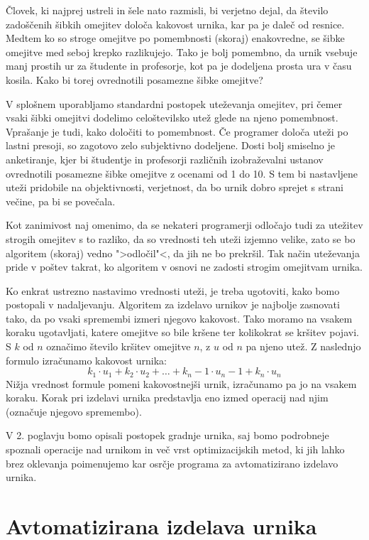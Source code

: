 \documentclass[a4paper, 10pt]{article}
\begin{document}
Človek, ki najprej ustreli in šele nato razmisli, bi verjetno dejal, da število
zadoščenih šibkih omejitev določa kakovost urnika, kar pa je daleč od resnice. Medtem
ko so stroge omejitve po pomembnosti (skoraj) enakovredne, se šibke omejitve med seboj
krepko razlikujejo. Tako je bolj pomembno, da urnik vsebuje manj prostih ur za
študente in profesorje, kot pa je dodeljena prosta ura v času kosila. Kako bi torej
ovrednotili posamezne šibke omejitve?

V splošnem uporabljamo standardni postopek uteževanja omejitev, pri čemer vsaki šibki
omejitvi dodelimo celoštevilsko utež glede na njeno pomembnost. Vprašanje je tudi, kako
določiti to pomembnost. Če programer določa uteži po lastni presoji, so zagotovo zelo
subjektivno dodeljene. Dosti bolj smiselno je anketiranje, kjer bi študentje in profesorji
različnih izobraževalni ustanov ovrednotili posamezne šibke omejitve z ocenami od 1 do 10.
S tem bi nastavljene uteži pridobile na objektivnosti, verjetnost, da bo urnik dobro
sprejet s strani večine, pa bi se povečala.

Kot zanimivost naj omenimo, da se nekateri programerji odločajo tudi za utežitev strogih
omejitev s to razliko, da so vrednosti teh uteži izjemno velike, zato se bo algoritem
(skoraj) vedno ">odločil"<, da jih ne bo prekršil. Tak način uteževanja pride v poštev
takrat, ko algoritem v osnovi ne zadosti strogim omejitvam urnika.

Ko enkrat ustrezno nastavimo vrednosti uteži, je treba ugotoviti, kako bomo postopali
v nadaljevanju. Algoritem za izdelavo urnikov je najbolje zasnovati tako, da po vsaki
spremembi izmeri njegovo kakovost. Tako moramo na vsakem koraku ugotavljati, katere
omejitve so bile kršene ter kolikokrat se kršitev pojavi. S $k$ od $n$ označimo število
kršitev omejitve $n$, z $u$ od $n$ pa njeno utež. Z naslednjo formulo izračunamo
kakovost urnika:
\[ k_1 \cdot u_1 + k_2 \cdot u_2 + \dots + k_n-1 \cdot u_n-1 + k_n \cdot u_n \]
Nižja vrednost formule pomeni kakovostnejši urnik, izračunamo pa jo na vsakem koraku.
Korak pri izdelavi urnika predstavlja eno izmed operacij nad njim (označuje njegovo
spremembo).

V 2. poglavju bomo opisali postopek gradnje urnika, saj bomo podrobneje spoznali
operacije nad urnikom in več vrst optimizacijskih metod, ki jih lahko brez oklevanja
poimenujemo kar osrčje programa za avtomatizirano izdelavo urnika.

\section{Avtomatizirana izdelava urnika}
\end{document}
